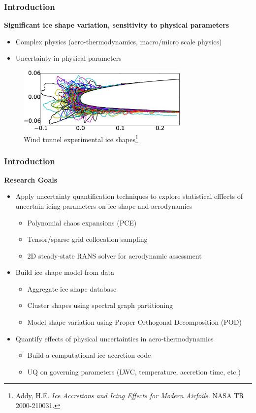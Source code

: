 \documentclass[9pt]{beamer}
\begin{document}
\begin{frame}
\frametitle{Introduction}
\label{sec-1-7}

\textbf{Significant ice shape variation, sensitivity to physical parameters}
\begin{itemize}
\item Complex physics (aero-thermodynamics, macro/micro scale physics)
\item Uncertainty in physical parameters
\end{itemize}

\vspace*{-0.0cm}\begin{figure}
      \includegraphics[width=0.75\textwidth]{GlobalDataSet}
      \caption{Wind tunnel experimental ice shapes\footnote{\tiny Addy, H.E. {\it Ice Accretions and Icing Effects for Modern Airfoils}. NASA TR 2000-210031.}}
\end{figure}
\end{frame}
\begin{frame}
\frametitle{Introduction}
\label{sec-1-8}

\textbf{Research Goals}
\begin{itemize}
\item Apply uncertainty quantification techniques to explore statistical
  efffects of uncertain icing parameters on ice shape and aerodynamics
\begin{itemize}
\item Polynomial chaos expansions (PCE)
\item Tensor/sparse grid collocation sampling
\item 2D steady-state RANS solver for aerodynamic assessment
\end{itemize}
\item Build ice shape model from data
\begin{itemize}
\item Aggregate ice shape database
\item Cluster shapes using spectral graph partitioning
\item Model shape variation using Proper Orthogonal Decomposition (POD)
\end{itemize}
\item Quantify effects of physical uncertainties in aero-thermodynamics
\begin{itemize}
\item Build a computational ice-accretion code
\item UQ on governing parameters (LWC, temperature, accretion time, etc.)
\end{itemize}
\end{itemize}
\end{frame}
\end{document}
